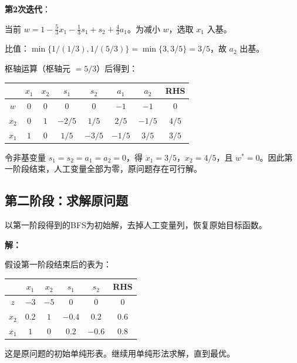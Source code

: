 \begin{example}
\textbf{第2次迭代}：

当前 $w = 1 - \frac{5}{3}x_1 - \frac{1}{3}s_1 + s_2 + \frac{4}{3}a_1$。为减小 $w$，选取 $x_1$ 入基。

比值：$\min\{1/(1/3), 1/(5/3)\} = \min\{3, 3/5\} = 3/5$，故 $a_2$ 出基。

枢轴运算（枢轴元 $=5/3$）后得到：

\begin{table}[H]
\centering
\begin{tabular}{@{}c|cccccc|c@{}}
\toprule
& $x_1$ & $x_2$ & $s_1$ & $s_2$ & $a_1$ & $a_2$ & RHS \\
\midrule
$w$ & $0$ & $0$ & $0$ & $0$ & $-1$ & $-1$ & $0$ \\
\midrule
$x_2$ & $0$ & $1$ & $-2/5$ & $1/5$ & $2/5$ & $-1/5$ & $4/5$ \\
$x_1$ & $1$ & $0$ & $1/5$ & $-3/5$ & $-1/5$ & $3/5$ & $3/5$ \\
\bottomrule
\end{tabular}
\end{table}

令非基变量 $s_1=s_2=a_1=a_2=0$，得 $x_1=3/5$，$x_2=4/5$，且 $w^*=0$。因此第一阶段结束，人工变量全部为零，原问题存在可行解。
\end{example}

\subsection{第二阶段：求解原问题}

\begin{example}[第二阶段]
以第一阶段得到的BFS为初始解，去掉人工变量列，恢复原始目标函数。

\textbf{解：}

假设第一阶段结束后的表为：

\begin{table}[H]
\centering
\begin{tabular}{@{}c|cccc|c@{}}
\toprule
& $x_1$ & $x_2$ & $s_1$ & $s_2$ & RHS \\
\midrule
$z$ & $-3$ & $-5$ & $0$ & $0$ & $0$ \\
\midrule
$x_2$ & $0.2$ & $1$ & $-0.4$ & $0.2$ & $0.6$ \\
$x_1$ & $1$ & $0$ & $0.2$ & $-0.6$ & $0.8$ \\
\bottomrule
\end{tabular}
\end{table}

这是原问题的初始单纯形表。继续用单纯形法求解，直到最优。
\end{example}

